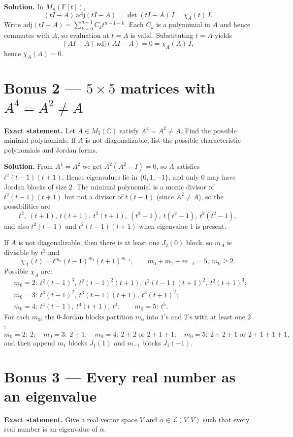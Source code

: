 \documentclass[12pt,a4paper]{article}
\theoremstyle{plain}
\theoremstyle{definition}      %
\begin{document}
\textbf{Solution.}
In $M_n(\mathbb F[t])$,
\[
(tI-A)\,\mathrm{adj}(tI-A)=\det(tI-A)\,I=\chi_A(t)\,I.
\]
Write $\mathrm{adj}(tI-A)=\sum_{k=0}^{n-1} C_k t^{n-1-k}$.
Each $C_k$ is a polynomial in $A$ and hence commutes with $A$, so evaluation at $t=A$ is valid.
Substituting $t=A$ yields
\[
(AI-A)\,\mathrm{adj}(AI-A)=0=\chi_A(A)\,I,
\]
hence $\chi_A(A)=0$.

\section*{Bonus 2 — $5\times5$ matrices with $A^4=A^2\neq A$}

\textbf{Exact statement.}
Let $A\in M_5(\mathbb C)$ satisfy $A^4=A^2\neq A$.
Find the possible minimal polynomials. If $A$ is not diagonalizable, list the possible characteristic polynomials and Jordan forms.

\textbf{Solution.}
From $A^4=A^2$ we get $A^2(A^2-I)=0$, so $A$ satisfies $t^2(t-1)(t+1)$.
Hence eigenvalues lie in $\{0,1,-1\}$, and only $0$ may have Jordan blocks of size $2$.
The minimal polynomial is a monic divisor of $t^2(t-1)(t+1)$ but not a divisor of $t(t-1)$ (since $A^2\neq A$), so the possibilities are
\[
t^2,\ (t+1),\ t(t+1),\ t^2(t+1),\ (t^2-1),\ t(t^2-1),\ t^2(t^2-1),
\]
and also $t^2(t-1)$ and $t^2(t-1)(t+1)$ when eigenvalue $1$ is present.

If $A$ is not diagonalizable, then there is at least one $J_2(0)$ block, so $m_A$ is divisible by $t^2$ and
\[
\chi_A(t)=t^{m_0}(t-1)^{m_1}(t+1)^{m_{-1}},\qquad m_0+m_1+m_{-1}=5,\ m_0\ge 2.
\]
Possible $\chi_A$ are:
\[
\begin{aligned}
	&m_0=2:\ t^2(t-1)^3,\ t^2(t-1)^2(t+1),\ t^2(t-1)(t+1)^2,\ t^2(t+1)^3;\\
	&m_0=3:\ t^3(t-1)^2,\ t^3(t-1)(t+1),\ t^3(t+1)^2;\\
	&m_0=4:\ t^4(t-1),\ t^4(t+1),\ t^4;\qquad
	m_0=5:\ t^5.
\end{aligned}
\]
For each $m_0$, the $0$-Jordan blocks partition $m_0$ into $1$'s and $2$'s with at least one $2$:
\[
m_0=2:\ 2;\quad
m_0=3:\ 2+1;\quad
m_0=4:\ 2+2 \text{ or } 2+1+1;\quad
m_0=5:\ 2+2+1 \text{ or } 2+1+1+1,
\]
and then append $m_1$ blocks $J_1(1)$ and $m_{-1}$ blocks $J_1(-1)$.

\section*{Bonus 3 — Every real number as an eigenvalue}

\textbf{Exact statement.}
Give a real vector space $V$ and $\alpha\in\mathcal L(V,V)$ such that every real number is an eigenvalue of $\alpha$.
\end{document}
